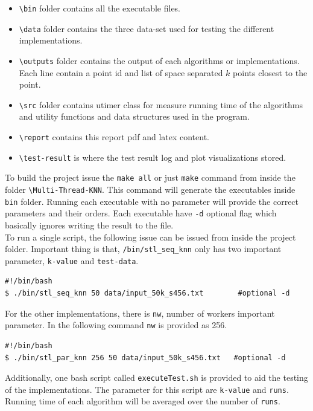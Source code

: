 \documentclass[12pt,a4paper]{report}
\begin{document}
\begin{itemize}
  \item \verb|\bin| folder contains all the executable files.
  \item \verb|\data| folder contains the three data-set used for testing the different implementations.
  \item \verb|\outputs| folder contains the output of each algorithms or implementations. Each line contain a point id and list of space separated $k$ points closest to the point.
  \item \verb|\src| folder contains utimer class for measure running time of the algorithms and utility functions and data structures used in the program.
   \item \verb|\report| contains this report pdf and latex content.
   \item \verb|\test-result| is where the test result log and plot visualizations stored.
\end{itemize}

To build the project issue the \verb|make all| or just \verb|make| command from inside the folder \verb|\Multi-Thread-KNN|. This command will generate the executables inside \verb|bin| folder. Running each executable with no parameter will provide the correct parameters and their orders. Each executable have \verb|-d| optional flag which basically ignores writing the result to the file.\\

To run a single script, the following issue can be issued from inside the project folder. Important thing is that, \verb|/bin/stl_seq_knn| only has two important parameter, \verb|k-value| and \verb|test-data|.

\begin{verbatim}
#!/bin/bash
$ ./bin/stl_seq_knn 50 data/input_50k_s456.txt        #optional -d 
\end{verbatim}

For the other implementations, there is \verb|nw|, number of workers important parameter. In the following command \verb|nw| is provided as 256. 

\begin{verbatim}
#!/bin/bash
$ ./bin/stl_par_knn 256 50 data/input_50k_s456.txt   #optional -d
\end{verbatim}

Additionally, one bash script called \verb|executeTest.sh| is provided to aid the testing of the implementations. The parameter for this script are \verb|k-value| and \verb|runs|. Running time of each algorithm will be averaged over the number of \verb|runs|.
\end{document}
